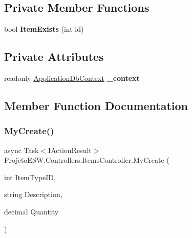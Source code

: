 \subsection*{Private Member Functions}
\begin{DoxyCompactItemize}
\item 
\mbox{\label{class_projeto_e_s_w_1_1_controllers_1_1_items_controller_a164d332c078dce64de127a1b8fd30384}} 
bool {\bfseries Item\+Exists} (int id)
\end{DoxyCompactItemize}
\subsection*{Private Attributes}
\begin{DoxyCompactItemize}
\item 
\mbox{\label{class_projeto_e_s_w_1_1_controllers_1_1_items_controller_a6039fb5bb6b4bb57756ffca4d76a89e0}} 
readonly \mbox{\hyperlink{class_projeto_e_s_w_1_1_data_1_1_application_db_context}{Application\+Db\+Context}} {\bfseries \+\_\+context}
\end{DoxyCompactItemize}


\subsection{Member Function Documentation}
\mbox{\label{class_projeto_e_s_w_1_1_controllers_1_1_items_controller_af64262de25e9bef58abb43e49bf55509}} 
\subsubsection{\texorpdfstring{My\+Create()}{MyCreate()}}
{\footnotesize\ttfamily async Task$<$I\+Action\+Result$>$ Projeto\+E\+S\+W.\+Controllers.\+Items\+Controller.\+My\+Create (\begin{DoxyParamCaption}\item[{int}]{Item\+Type\+ID,  }\item[{string}]{Description,  }\item[{decimal}]{Quantity }\end{DoxyParamCaption})}



